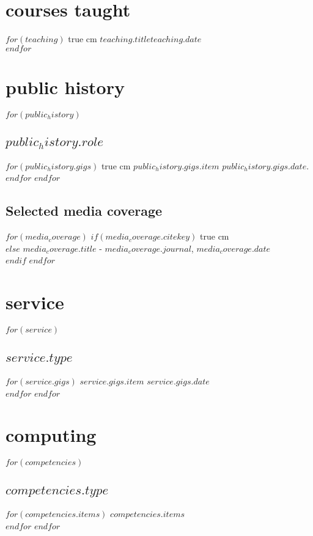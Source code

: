 \documentclass[11pt, letter]{article}
\def\ind{\hangindent=1 true cm\hangafter=1 \noindent}
\begin{document}
\section{courses taught}

$for(teaching)$
\ind $teaching.title$\hspace*{\fill}$teaching.date$\\[.15cm]
$endfor$


\section{public history}

$for(public_history)$
\subsection{$public_history.role$}
$for(public_history.gigs)$
\ind $public_history.gigs.item$ $public_history.gigs.date$.\\[.15cm]
$endfor$
$endfor$
\subsection{Selected media coverage}

$for(media_coverage)$
$if(media_coverage.citekey)$
\ind {}\\
$else$
$media_coverage.title$ -  \textit{$media_coverage.journal$}, $media_coverage.date$\\[.15cm]
$endif$
$endfor$


\section{service}
$for(service)$
\subsection{$service.type$}
$for(service.gigs)$
$service.gigs.item$ \hspace*{\fill}$service.gigs.date$\\[.15cm]
$endfor$
$endfor$


\section{computing}
$for(competencies)$
\subsection{\itshape $competencies.type$}
$for(competencies.items)$
$competencies.items$\\[.15cm]
$endfor$
$endfor$
\end{document}
